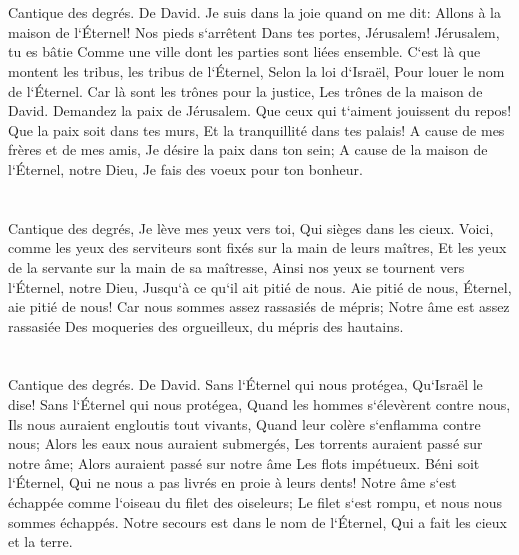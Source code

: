 \chapter{}

\verse Cantique des degrés. De David. Je suis dans la joie quand on me dit: Allons à la maison de l`Éternel! 
\verse Nos pieds s`arrêtent Dans tes portes, Jérusalem! 
\verse Jérusalem, tu es bâtie Comme une ville dont les parties sont liées ensemble. 
\verse C`est là que montent les tribus, les tribus de l`Éternel, Selon la loi d`Israël, Pour louer le nom de l`Éternel. 
\verse Car là sont les trônes pour la justice, Les trônes de la maison de David. 
\verse Demandez la paix de Jérusalem. Que ceux qui t`aiment jouissent du repos! 
\verse Que la paix soit dans tes murs, Et la tranquillité dans tes palais! 
\verse A cause de mes frères et de mes amis, Je désire la paix dans ton sein; 
\verse A cause de la maison de l`Éternel, notre Dieu, Je fais des voeux pour ton bonheur. 

\chapter{}

\verse Cantique des degrés, Je lève mes yeux vers toi, Qui sièges dans les cieux. 
\verse Voici, comme les yeux des serviteurs sont fixés sur la main de leurs maîtres, Et les yeux de la servante sur la main de sa maîtresse, Ainsi nos yeux se tournent vers l`Éternel, notre Dieu, Jusqu`à ce qu`il ait pitié de nous. 
\verse Aie pitié de nous, Éternel, aie pitié de nous! Car nous sommes assez rassasiés de mépris; 
\verse Notre âme est assez rassasiée Des moqueries des orgueilleux, du mépris des hautains. 

\chapter{}

\verse Cantique des degrés. De David. Sans l`Éternel qui nous protégea, Qu`Israël le dise! 
\verse Sans l`Éternel qui nous protégea, Quand les hommes s`élevèrent contre nous, 
\verse Ils nous auraient engloutis tout vivants, Quand leur colère s`enflamma contre nous; 
\verse Alors les eaux nous auraient submergés, Les torrents auraient passé sur notre âme; 
\verse Alors auraient passé sur notre âme Les flots impétueux. 
\verse Béni soit l`Éternel, Qui ne nous a pas livrés en proie à leurs dents! 
\verse Notre âme s`est échappée comme l`oiseau du filet des oiseleurs; Le filet s`est rompu, et nous nous sommes échappés. 
\verse Notre secours est dans le nom de l`Éternel, Qui a fait les cieux et la terre. 

